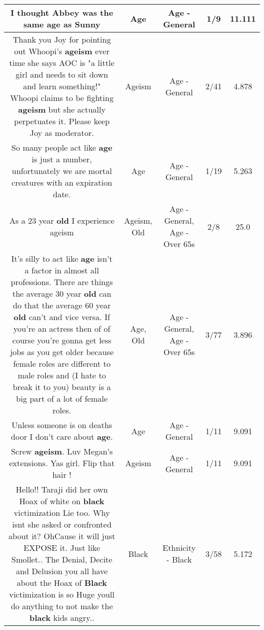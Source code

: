 \documentclass[11pt]{article}
\newlength\mylength
\begin{document}
\begin{center}
\begin{longtable}{|C{.65\mylength}|C{.30\mylength}|C{.12\mylength}|C{.12\mylength}|C{.12\mylength}|}
  \small I thought Abbey was the same \textbf{age} as Sunny\normalsize   & Age & Age - General & 1/9 & 11.111 \\  \hline
  \small Thank you Joy for pointing out Whoopi's \textbf{ageism} ever time she says AOC is "a little girl and needs to sit down and learn something!" Whoopi claims to be fighting \textbf{ageism} but she actually perpetuates it. Please keep Joy as moderator.\normalsize   & Ageism & Age - General & 2/41 & 4.878 \\  \hline
  \small So many people act like \textbf{age} is just a number, unfortunately we are mortal creatures with an expiration date.\normalsize   & Age & Age - General & 1/19 & 5.263 \\  \hline
  \small As a 23 year \textbf{old} I experience ageism\normalsize   & Ageism, Old & Age - General, Age - Over 65s & 2/8 & 25.0 \\  \hline
  \small It's silly to act like \textbf{age} isn't a factor in almost all professions. There are things the average 30 year \textbf{old} can do that the average 60 year \textbf{old} can't and vice versa. If you're an actress then of of course you're gonna get less jobs as you get older because female roles are different to male roles and (I hate to break it to you) beauty is a big part of a lot of female roles.\normalsize   & Age, Old & Age - General, Age - Over 65s & 3/77 & 3.896 \\  \hline
  \small Unless someone is on deaths door I don't care about \textbf{age}.\normalsize   & Age & Age - General & 1/11 & 9.091 \\  \hline
  \small Screw \textbf{ageism}. Luv Megan's extensions. Yas girl. Flip that hair !\normalsize   & Ageism & Age - General & 1/11 & 9.091 \\  \hline
  \small Hello!! Taraji did her own Hoax of  white on \textbf{black} victimization Lie too. Why isnt she asked or confronted about it? OhCause it will just EXPOSE it. Just like Smollet.. The Denial, Decite and Delusion you all have about the Hoax of \textbf{Black} victimization is so Huge  youll do anything to not make the \textbf{black} kids angry..\normalsize   & Black & Ethnicity - Black & 3/58 & 5.172 \\  \hline

\end{longtable}
\end{center}
\end{document}
